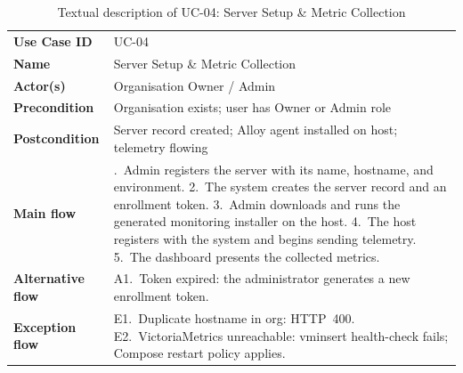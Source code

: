 \begin{longtable}{@{}>{\raggedright\arraybackslash}p{} >{\raggedright\arraybackslash}p{}@{}}
\caption{Textual description of UC-04: Server Setup \& Metric Collection}\label{tab:uc04}\\
\toprule
\textbf{Use Case ID} & UC-04\\
\textbf{Name} & Server Setup \& Metric Collection\\
\textbf{Actor(s)} & Organisation Owner / Admin\\
\textbf{Precondition} & Organisation exists; user has Owner or Admin role\\
\textbf{Postcondition} & Server record created; Alloy agent installed on host; telemetry flowing\\
\textbf{Main flow} &
  1.~Admin registers the server with its name, hostname, and environment.
  2.~The system creates the server record and an enrollment token.
  3.~Admin downloads and runs the generated monitoring installer on the host.
  4.~The host registers with the system and begins sending telemetry.
  5.~The dashboard presents the collected metrics.\\
\textbf{Alternative flow} &
  A1.~Token expired: the administrator generates a new enrollment token.\\
\textbf{Exception flow} &
  E1.~Duplicate hostname in org: HTTP~400.
  E2.~VictoriaMetrics unreachable: vminsert health-check fails; Compose restart policy applies.\\
\bottomrule
\end{longtable}

